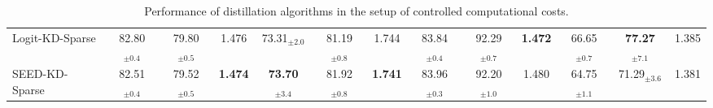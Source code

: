 \begin{table}[]
{\begin{tabular}{@{}lcccccccccccc@{}}

Logit-KD-Sparse      &   82.80$_{\pm 0.4}$      &  79.80$_{\pm 0.5}$  &    1.476             &  73.31$_{\pm 2.0}$   & 81.19$_{\pm 0.8}$ &     1.744      &  83.84$_{\pm 0.4}$     &  92.29$_{\pm 0.7}$   &   \textbf{1.472}    &  66.65$_{\pm 0.7}$  & \textbf{77.27$_{\pm 7.1}$} &  1.385 \\
SEED-KD-Sparse      &  82.51$_{\pm 0.4}$         & 79.52$_{\pm 0.5}$  &  \textbf{1.474}       & \textbf{73.70$_{\pm 3.4}$}             & 81.92$_{\pm 0.8}$      & \textbf{1.741}    & 83.96$_{\pm 0.3}$              & 92.20$_{\pm 1.0}$      & 1.480     & 64.75$_{\pm 1.1}$         & 71.29$_{\pm 3.6}$   & 1.381  \\
\bottomrule

\end{tabular}
}
\caption{Performance of distillation algorithms in the setup of controlled computational costs.}
\label{tab:controlled_results}
\vspace{-0.2cm}
\end{table}
